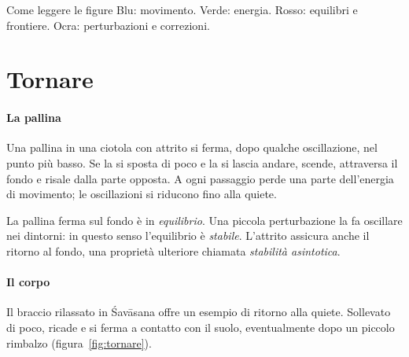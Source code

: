 \documentclass[11pt]{article}
\begin{document}
\begin{riquadro}{Come leggere le figure}
Blu: movimento. Verde: energia. Rosso: equilibri e frontiere. Ocra: perturbazioni e correzioni.
\end{riquadro}

\section{Tornare}\label{sec:tornare}

\paragraph{La pallina} Una pallina in una ciotola con attrito si ferma, dopo qualche oscillazione, nel punto più basso. Se la si sposta di poco e la si lascia andare, scende, attraversa il fondo e risale dalla parte opposta. A ogni passaggio perde una parte dell'energia di movimento; le oscillazioni si riducono fino alla quiete.

La pallina ferma sul fondo è in \emph{equilibrio}. Una piccola perturbazione la fa oscillare nei dintorni: in questo senso l'equilibrio è \emph{stabile}. L'attrito assicura anche il ritorno al fondo, una proprietà ulteriore chiamata \emph{stabilità asintotica}.

\paragraph{Il corpo} Il braccio rilassato in Śavāsana offre un esempio di ritorno alla quiete. Sollevato di poco, ricade e si ferma a contatto con il suolo, eventualmente dopo un piccolo rimbalzo (figura~\ref{fig:tornare}).
\end{document}

